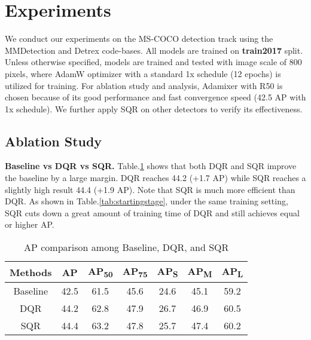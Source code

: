 \documentclass[10pt,twocolumn,letterpaper]{article}
\begin{document}
\section{Experiments}
\label{sec:exp}

We conduct our experiments on the MS-COCO \cite{Lin2014MicrosoftCC} detection track using the MMDetection \cite{mmdetection} and Detrex \cite{ren2022detrex} code-bases. All models are trained on \textbf{train2017} split. Unless otherwise specified, models are trained and tested with image scale of 800 pixels, where AdamW optimizer with a standard 1x schedule (12 epochs) is utilized for training. For ablation study and analysis, Adamixer \cite{Gao2022AdaMixerAF} with R50 \cite{He2016DeepRL} is chosen because of its good performance and fast convergence speed (42.5 AP with 1x schedule). We further apply SQR on other detectors to verify its effectiveness. 

\subsection{Ablation Study}
\textbf{Baseline vs DQR vs SQR.} Table.\ref{tab:baseline_vs_qr} shows that both DQR and SQR improve the baseline by a large margin. DQR reaches 44.2 (+1.7 AP) while SQR reaches a slightly high result 44.4 (+1.9 AP). Note that SQR is much more efficient than DQR. As shown in Table.\ref{tab:startingstage}, under the same training setting, SQR cuts down a great amount of training time of DQR and still achieves equal or higher AP. 

\begin{comment}
First, we investigate the effectiveness of DQR and SQR on Adamixer. The results are summarized in Table \ref{tab:baseline_vs_qr}. Both can improve the baseline performance. However, SQR cuts down nearly half of the loss calculation and memory consumption and still achieves better results. We observer similar performances on other model architectures. So for the rest of the ablation study, we follow SQR for its efficiency. 
\end{comment}


\begin{table}[]
    \centering
    \begin{tabular}{c|c|c|c|c|c|c}
    \toprule[1pt]
        Methods & AP   & AP\textsubscript{50}    & AP\textsubscript{75}  & AP\textsubscript{S}   & AP\textsubscript{M}   & AP\textsubscript{L}  \\ \midrule
        
    Baseline       & 42.5 & 61.5 & 45.6 & 24.6  & 45.1  & 59.2 \\
      DQR          & 44.2 & 62.8 & 47.9 & 26.7  & 46.9  & 60.5 \\
      SQR          & 44.4 & 63.2 & 47.8 & 25.7  & 47.4  & 60.2 \\
       \bottomrule
    \end{tabular}
    \caption{AP comparison among Baseline, DQR, and SQR}
    \label{tab:baseline_vs_qr}
\end{table}
\end{document}

